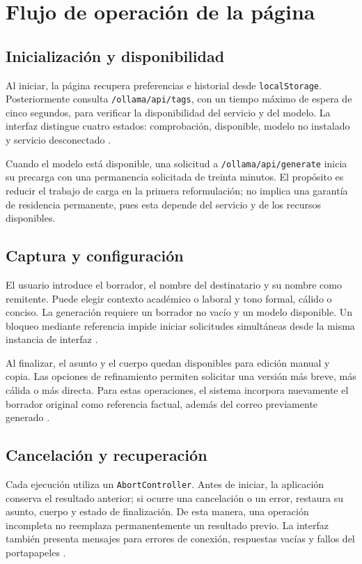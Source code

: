 \documentclass[conference]{IEEEtran}
\begin{document}
\section{Flujo de operación de la página}
\subsection{Inicialización y disponibilidad}
Al iniciar, la página recupera preferencias e historial desde \texttt{localStorage}. Posteriormente consulta \texttt{/ollama/api/tags}, con un tiempo máximo de espera de cinco segundos, para verificar la disponibilidad del servicio y del modelo. La interfaz distingue cuatro estados: comprobación, disponible, modelo no instalado y servicio desconectado \cite{app,ollama}.

Cuando el modelo está disponible, una solicitud a \texttt{/ollama/api/generate} inicia su precarga con una permanencia solicitada de treinta minutos. El propósito es reducir el trabajo de carga en la primera reformulación; no implica una garantía de residencia permanente, pues esta depende del servicio y de los recursos disponibles.

\subsection{Captura y configuración}
El usuario introduce el borrador, el nombre del destinatario y su nombre como remitente. Puede elegir contexto académico o laboral y tono formal, cálido o conciso. La generación requiere un borrador no vacío y un modelo disponible. Un bloqueo mediante referencia impide iniciar solicitudes simultáneas desde la misma instancia de interfaz \cite{app}.

Al finalizar, el asunto y el cuerpo quedan disponibles para edición manual y copia. Las opciones de refinamiento permiten solicitar una versión más breve, más cálida o más directa. Para estas operaciones, el sistema incorpora nuevamente el borrador original como referencia factual, además del correo previamente generado \cite{ollama}.

\subsection{Cancelación y recuperación}
Cada ejecución utiliza un \texttt{AbortController}. Antes de iniciar, la aplicación conserva el resultado anterior; si ocurre una cancelación o un error, restaura su asunto, cuerpo y estado de finalización. De esta manera, una operación incompleta no reemplaza permanentemente un resultado previo. La interfaz también presenta mensajes para errores de conexión, respuestas vacías y fallos del portapapeles \cite{app}.
\end{document}
